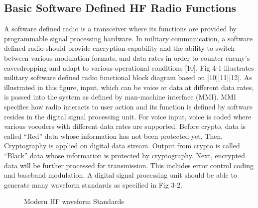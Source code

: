 \documentclass[conference]{IEEEtran}
\begin{document}
\subsection{Basic Software Defined HF Radio Functions}
A software defined radio is a transceiver where its functions are provided by programmable signal processing hardware. In military communication, a software defined radio should provide encryption capability and the ability to switch between various modulation formats, and data rates in order to counter enemy’s eavesdropping and adapt to various operational conditions [10]. Fig 4-1 illustrates military software defined radio functional block diagram based on [10][11][12]. As illustrated in this figure, input, which can be voice or data at different data rates, is passed into the system as defined by man-machine interface (MMI). MMI specifies how radio interacts to user action and its function is defined by software resides in the digital signal processing unit. For voice input, voice is coded where various vocoders with different data rates are supported. Before crypto, data is called “Red” data whose information has not been protected yet. Then, Cryptography is applied on digital data stream. Output from crypto is called “Black” data whose information is protected by cryptography. Next, encrypted data will be further processed for transmission. This includes error control coding and baseband modulation. A digital signal processing unit should be able to generate many waveform standards as specified in Fig 3-2. 

\begin{figure}[h!]
	\centering
	\caption{Modern HF waveform Standards}
\end{figure}
\end{document}
